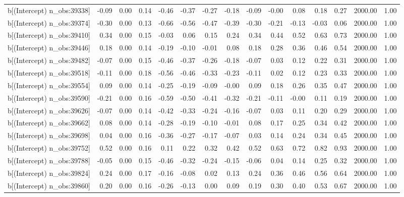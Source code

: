 \begin{table}[ht]
\begin{tabular}{rrrrrrrrrrrrrrr}
  b[(Intercept) n\_obs:39338] & -0.09 & 0.00 & 0.14 & -0.46 & -0.37 & -0.27 & -0.18 & -0.09 & -0.00 & 0.08 & 0.18 & 0.27 & 2000.00 & 1.00 \\ 
  b[(Intercept) n\_obs:39374] & -0.30 & 0.00 & 0.13 & -0.66 & -0.56 & -0.47 & -0.39 & -0.30 & -0.21 & -0.13 & -0.03 & 0.06 & 2000.00 & 1.00 \\ 
  b[(Intercept) n\_obs:39410] & 0.34 & 0.00 & 0.15 & -0.03 & 0.06 & 0.15 & 0.24 & 0.34 & 0.44 & 0.52 & 0.63 & 0.73 & 2000.00 & 1.00 \\ 
  b[(Intercept) n\_obs:39446] & 0.18 & 0.00 & 0.14 & -0.19 & -0.10 & -0.01 & 0.08 & 0.18 & 0.28 & 0.36 & 0.46 & 0.54 & 2000.00 & 1.00 \\ 
  b[(Intercept) n\_obs:39482] & -0.07 & 0.00 & 0.15 & -0.46 & -0.37 & -0.26 & -0.18 & -0.07 & 0.03 & 0.12 & 0.22 & 0.31 & 2000.00 & 1.00 \\ 
  b[(Intercept) n\_obs:39518] & -0.11 & 0.00 & 0.18 & -0.56 & -0.46 & -0.33 & -0.23 & -0.11 & 0.02 & 0.12 & 0.23 & 0.33 & 2000.00 & 1.00 \\ 
  b[(Intercept) n\_obs:39554] & 0.09 & 0.00 & 0.14 & -0.25 & -0.19 & -0.09 & -0.00 & 0.09 & 0.18 & 0.26 & 0.35 & 0.47 & 2000.00 & 1.00 \\ 
  b[(Intercept) n\_obs:39590] & -0.21 & 0.00 & 0.16 & -0.59 & -0.50 & -0.41 & -0.32 & -0.21 & -0.11 & -0.00 & 0.11 & 0.19 & 2000.00 & 1.00 \\ 
  b[(Intercept) n\_obs:39626] & -0.07 & 0.00 & 0.14 & -0.42 & -0.33 & -0.24 & -0.16 & -0.07 & 0.03 & 0.11 & 0.20 & 0.29 & 2000.00 & 1.00 \\ 
  b[(Intercept) n\_obs:39662] & 0.08 & 0.00 & 0.14 & -0.28 & -0.19 & -0.10 & -0.01 & 0.08 & 0.17 & 0.25 & 0.34 & 0.42 & 2000.00 & 1.00 \\ 
  b[(Intercept) n\_obs:39698] & 0.04 & 0.00 & 0.16 & -0.36 & -0.27 & -0.17 & -0.07 & 0.03 & 0.14 & 0.24 & 0.34 & 0.45 & 2000.00 & 1.00 \\ 
  b[(Intercept) n\_obs:39752] & 0.52 & 0.00 & 0.16 & 0.11 & 0.22 & 0.32 & 0.42 & 0.52 & 0.63 & 0.72 & 0.82 & 0.93 & 2000.00 & 1.00 \\ 
  b[(Intercept) n\_obs:39788] & -0.05 & 0.00 & 0.15 & -0.46 & -0.32 & -0.24 & -0.15 & -0.06 & 0.04 & 0.14 & 0.25 & 0.32 & 2000.00 & 1.00 \\ 
  b[(Intercept) n\_obs:39824] & 0.24 & 0.00 & 0.17 & -0.16 & -0.08 & 0.02 & 0.13 & 0.24 & 0.36 & 0.46 & 0.56 & 0.64 & 2000.00 & 1.00 \\ 
  b[(Intercept) n\_obs:39860] & 0.20 & 0.00 & 0.16 & -0.26 & -0.13 & 0.00 & 0.09 & 0.19 & 0.30 & 0.40 & 0.53 & 0.67 & 2000.00 & 1.00 \\ 

\end{tabular}
\end{table}
